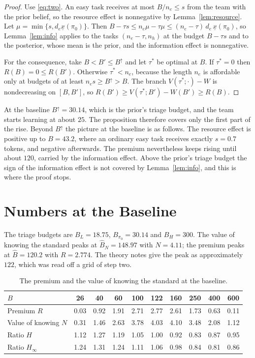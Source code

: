 \documentclass[11pt]{article}
\theoremstyle{definition}
\begin{document}
\begin{proof}
Use \eqref{eq:two}. An easy task receives at most $B/n_e\le s$ from the team with the prior belief, so the resource effect is nonnegative by Lemma~\ref{lem:resource}. Let $\mu=\min\{s,d_e\underline x(\pi_0)\}$. Then $B-\tau s\le n_e\mu-\tau\mu\le(n_e-\tau)\,d_e\,\underline x(\pi_0)$, so Lemma~\ref{lem:info} applies to the tasks $(n_e-\tau,n_h)$ at the budget $B-\tau s$ and to the posterior, whose mean is the prior, and the information effect is nonnegative.

For the consequence, take $B<B'\le B^{\uparrow}$ and let $\tau^*$ be optimal at $B$. If $\tau^*=0$ then $R(B)=0\le R(B')$. Otherwise $\tau^*<n_e$, because the length $n_e$ is affordable only at budgets of at least $n_es\ge B^{\uparrow}>B$. The branch $V(\tau^*;\cdot)-W$ is nondecreasing on $[B,B']$, so $R(B')\ge V(\tau^*;B')-W(B')\ge R(B)$.
\end{proof}

At the baseline $B^{\uparrow}=30.14$, which is the prior's triage budget, and the team starts learning at about $25$. The proposition therefore covers only the first part of the rise. Beyond $B^{\uparrow}$ the picture at the baseline is as follows. The resource effect is positive up to $B=43.2$, where an ordinary easy task receives exactly $s=0.7$ tokens, and negative afterwards. The premium nevertheless keeps rising until about $120$, carried by the information effect. Above the prior's triage budget the sign of the information effect is not covered by Lemma~\ref{lem:info}, and this is where the proof stops.

\section{Numbers at the Baseline}

The triage budgets are $B_L=18.75$, $B_{\pi_0}=30.14$ and $B_H=300$. The value of knowing the standard peaks at $\hat B_N=148.97$ with $N=4.11$; the premium peaks at $\hat B=120.2$ with $R=2.774$. The theory notes give the peak as approximately $122$, which was read off a grid of step two.

\begin{table}[htbp]
\centering
\small
\begin{tabular}{@{}lccccccccc@{}}
\toprule
$B$ & 26 & 40 & 60 & 100 & 122 & 160 & 250 & 400 & 600 \\
\midrule
Premium $R$ & 0.03 & 0.92 & 1.91 & 2.71 & 2.77 & 2.61 & 1.73 & 0.63 & 0.11 \\
Value of knowing $N$ & 0.31 & 1.46 & 2.63 & 3.78 & 4.03 & 4.10 & 3.48 & 2.08 & 1.12 \\
Ratio $H$ & 1.12 & 1.27 & 1.19 & 1.05 & 1.00 & 0.92 & 0.83 & 0.87 & 0.95 \\
Ratio $H_\infty$ & 1.24 & 1.31 & 1.24 & 1.11 & 1.06 & 0.98 & 0.84 & 0.81 & 0.86 \\
\bottomrule
\end{tabular}
\caption{The premium and the value of knowing the standard at the baseline.}
\label{tab:NR}
\end{table}
\end{document}
